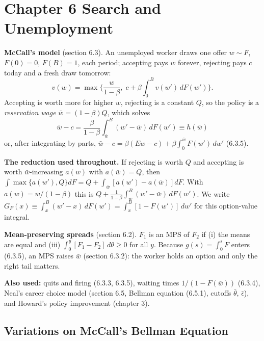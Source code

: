 \documentclass[12pt, letterpaper]{article}
\newcommand{\wb}{\bar w}
\newcommand{\Gint}[1]{\int_{#1}^{B}(w'-#1)\,dF(w')}
\begin{document}
\tableofcontents
\newpage

\section{Chapter 6 \quad Search and Unemployment}

\begin{tcolorbox}[theorybox,title={Chapter 6 Overview}]
\textbf{McCall's model} (section 6.3). An unemployed worker draws one offer $w\sim F$, $F(0)=0$, $F(B)=1$,
each period; accepting pays $w$ forever, rejecting pays $c$ today and a fresh draw tomorrow:
\[
v(w)=\max\Big\{\frac{w}{1-\beta},\;c+\beta\int_0^Bv(w')\,dF(w')\Big\}. \tag{6.3.1}
\]
Accepting is worth more for higher $w$, rejecting is a constant $Q$, so the policy is a
\emph{reservation wage} $\wb=(1-\beta)Q$, which solves
\[
\wb-c=\frac{\beta}{1-\beta}\Gint{\wb}\equiv h(\wb) \tag{6.3.3}
\]
or, after integrating by parts, $\wb-c=\beta(Ew-c)+\beta\int_0^{\wb}F(w')\,dw'$ (6.3.5).

\smallskip
\textbf{The reduction used throughout.} If rejecting is worth $Q$ and accepting is worth
$\wb$-increasing $a(w)$ with $a(\wb)=Q$, then $\int\max\{a(w'),Q\}dF=Q+\int_{\wb}[a(w')-a(\wb)]dF$. With
$a(w)=w/(1-\beta)$ this is $Q+\frac1{1-\beta}\Gint{\wb}$. We write
$G_F(x)\equiv\int_x^B(w'-x)\,dF(w')=\int_x^B[1-F(w')]\,dw'$ for this option-value integral.

\smallskip
\textbf{Mean-preserving spreads} (section 6.2). $F_1$ is an MPS of $F_2$ if (i) the means are equal and
(iii) $\int_0^y[F_1-F_2]\,d\theta\ge0$ for all $y$. Because $g(s)=\int_0^sF$ enters (6.3.5), an MPS raises
$\wb$ (section 6.3.2): the worker holds an option and only the right tail matters.

\smallskip
\textbf{Also used:} quits and firing (6.3.3, 6.3.5), waiting times $1/(1-F(\wb))$ (6.3.4), Neal's career
choice model (section 6.5, Bellman equation (6.5.1), cutoffs $\bar\theta$, $\bar\epsilon$), and Howard's
policy improvement (chapter 3).
\end{tcolorbox}

\subsection{Variations on McCall's Bellman Equation}
\end{document}
